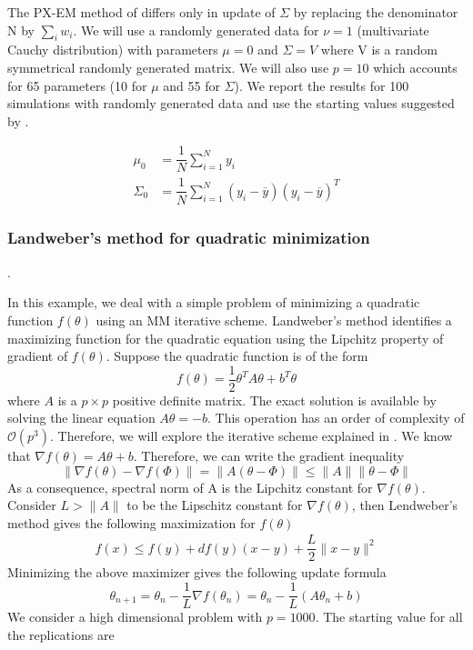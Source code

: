 \documentclass[12pt]{article}
\newcommand{\jx}[1]{{\color{blue}{ #1}}}
\begin{document}
 The PX-EM method of \cite{meng1997algorithm} differs only in update of $\Sigma$ by replacing the denominator N by $\sum_{i}w_i$. We will use a randomly generated data for $\nu = 1$ (multivariate Cauchy distribution) with parameters $\mu = 0$ and $\Sigma = V$ where V is a random symmetrical randomly generated matrix. We will also use $p = 10$ which accounts for 65 parameters (10 for $\mu$ and 55 for $\Sigma$). We report the results for 100 simulations with randomly generated data and use the starting values suggested by \cite{meng1997algorithm}.
 
 \begin{align*}
     \mu_0 &=  \dfrac{1}{N}\sum_{i=1}^{N}y_i\\
     \Sigma_0 &= \dfrac{1}{N}\sum_{i=1}^{N}(y_i - \overline{y})(y_i - \overline{y})^T
 \end{align*}
 

\subsubsection{Landweber's method for quadratic minimization}

\jx{If we do derive some theory and we assume conditions such as Lipschitz, then we may move this example up first and say that it is meant to confirm the theory in practice, i.e. we observe superlinear rate compared to the unaccelerated algorithm}.

In this example, we deal with a simple problem of minimizing a quadratic function $f(\theta)$ using an MM iterative scheme. Landweber's method identifies a maximizing function for the quadratic equation using the Lipchitz property of gradient of $f(\theta)$. Suppose the quadratic function is of the form 
\[
f(\theta) = \dfrac{1}{2}\theta^T A \theta + b^T \theta
\]
where $A$ is a $p \times p$ positive definite matrix. The exact solution is available by solving the linear equation $A\theta = -b$. This operation has an order of complexity of $\mathcal{O}(p^3)$. Therefore, we will explore the iterative scheme explained in \cite{lange2016mm}. We know that $\nabla f(\theta) = A \theta + b$. Therefore, we can write the gradient inequality
%
\[
\|\nabla f(\theta) - \nabla f(\Phi)\| = \|A(\theta - \Phi)\| \leq \|A\|\|\theta - \Phi\|
\]
%
As a consequence, spectral norm of A is the Lipchitz constant for $\nabla f(\theta)$. Consider $L > \|A\|$ to be the Lipschitz constant for $\nabla f(\theta)$, then Lendweber's method gives the following maximization for $f(\theta)$
%
\begin{align*}
    f(x) \leq f(y) + df(y) (x-y) + \dfrac{L}{2}\|x-y\|^2
\end{align*}
Minimizing the above maximizer gives the following update formula
\[
\theta_{n+1} = \theta_n - \dfrac{1}{L}\nabla f(\theta_n) = \theta_n - \dfrac{1}{L}(A\theta_n + b)
\]
We consider a high dimensional problem with $p = 1000$. The starting value for all the replications are 
\end{document}
